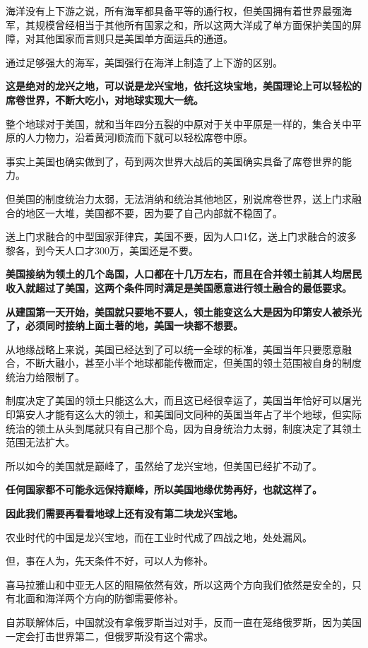 \documentclass[UTF8, 11pt, oneside]{ctexart}
\newcommand{\zd}[1]{\textbf{\textcolor[RGB]{123,12,0}{#1}}} %
\begin{document}
海洋没有上下游之说，所有海军都具备平等的通行权，但美国拥有着世界最强海军，其规模曾经相当于其他所有国家之和，所以这两大洋成了单方面保护美国的屏障，对其他国家而言则只是美国单方面运兵的通道。

通过足够强大的海军，美国强行在海洋上制造了上下游的区别。

\zd{这是绝对的龙兴之地，可以说是龙兴宝地，依托这块宝地，美国理论上可以轻松的席卷世界，不断大吃小，对地球实现大一统。}

整个地球对于美国，就和当年四分五裂的中原对于关中平原是一样的，集合关中平原的人力物力，沿着黄河顺流而下就可以轻松席卷中原。

事实上美国也确实做到了，苟到两次世界大战后的美国确实具备了席卷世界的能力。

但美国的制度统治力太弱，无法消纳和统治其他地区，别说席卷世界，送上门求融合的地区一大堆，美国都不要，因为要了自己内部就不稳固了。

送上门求融合的中型国家菲律宾，美国不要，因为人口1亿，送上门求融合的波多黎各，到今天人口才300万，美国还是不要。

\zd{美国接纳为领土的几个岛国，人口都在十几万左右，而且在合并领土前其人均居民收入就超过了美国，这两个条件同时满足是美国愿意进行领土融合的最低要求。}

\zd{从建国第一天开始，美国就只要地不要人，领土能变这么大是因为印第安人被杀光了，必须同时接纳上面土著的地，美国一块都不想要。}

从地缘战略上来说，美国已经达到了可以统一全球的标准，美国当年只要愿意融合，不断大融小，甚至小半个地球都能传檄而定，但美国的领土范围被自身的制度统治力给限制了。

制度决定了美国的领土只能这么大，而且这已经很幸运了，美国当年恰好可以屠光印第安人才能有这么大的领土，和美国同文同种的英国当年占了半个地球，但实际统治的领土从头到尾就只有自己那个岛，因为自身统治力太弱，制度决定了其领土范围无法扩大。

所以如今的美国就是巅峰了，虽然给了龙兴宝地，但美国已经扩不动了。

\zd{任何国家都不可能永远保持巅峰，所以美国地缘优势再好，也就这样了。}

\zd{因此我们需要再看看地球上还有没有第二块龙兴宝地。}

农业时代的中国是龙兴宝地，而在工业时代成了四战之地，处处漏风。

但，事在人为，先天条件不好，可以人为修补。

喜马拉雅山和中亚无人区的阻隔依然有效，所以这两个方向我们依然是安全的，只有北面和海洋两个方向的防御需要修补。

自苏联解体后，中国就没有拿俄罗斯当过对手，反而一直在笼络俄罗斯，因为美国一定会打击世界第二，但俄罗斯没有这个需求。
\end{document}
